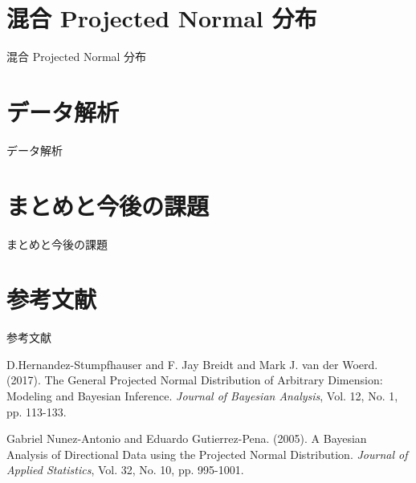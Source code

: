 \documentclass[dvipdfmx]{beamer}
\begin{document}
\section{混合 Projected Normal 分布}
\begin{frame}{混合 Projected Normal 分布}

\end{frame}

\section{データ解析}
\begin{frame}{データ解析}

\end{frame}

\section{まとめと今後の課題}
\begin{frame}{まとめと今後の課題}

\end{frame}

\section{参考文献}
\begin{frame}[allowframebreaks]{参考文献}

{\scriptsize
\begin{thebibliography}{99}
\setlength{\itemsep}{-.5zw}
\beamertemplatetextbibitems %

D.Hernandez-Stumpfhauser and F. Jay Breidt and Mark J. van der Woerd. (2017). The General Projected Normal Distribution of Arbitrary Dimension: Modeling and Bayesian Inference. {\it Journal of Bayesian Analysis}, Vol. 12, No. 1, pp. 113-133.

Gabriel Nunez-Antonio and Eduardo Gutierrez-Pena. (2005). A Bayesian Analysis of Directional Data using the Projected Normal Distribution. {\it Journal of Applied Statistics}, Vol. 32, No. 10, pp. 995-1001.

\end{thebibliography}
}

\end{frame}
\end{document}
